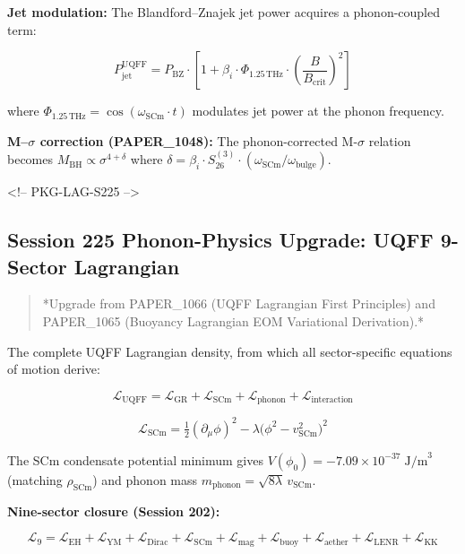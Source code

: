 \documentclass[12pt,a4paper]{article}
\begin{document}
\textbf{Jet modulation:} The Blandford--Znajek jet power acquires a phonon-coupled term:

\begin{equation}
P_{\text{jet}}^{\text{UQFF}} = P_{\text{BZ}} \cdot \left[1 + \beta_i \cdot \Phi_{1.25\,\text{THz}} \cdot \left(\frac{B}{B_{\text{crit}}}\right)^2\right]
\end{equation}

where $\Phi_{1.25\,\text{THz}} = \cos(\omega_{\text{SCm}} \cdot t)$ modulates jet power at the phonon frequency.

\textbf{M--$\sigma$ correction (PAPER\_1048):} The phonon-corrected M-$\sigma$ relation becomes $M_{\text{BH}} \propto \sigma^{4+\delta}$ where $\delta = \beta_i \cdot S_{26}^{(3)} \cdot (\omega_{\text{SCm}}/\omega_{\text{bulge}})$.

<!-- PKG-LAG-S225 -->

\subsection{Session 225 Phonon-Physics Upgrade: UQFF 9-Sector Lagrangian}

\begin{quote}
*Upgrade from PAPER\_1066 (UQFF Lagrangian First Principles) and
PAPER\_1065 (Buoyancy Lagrangian EOM Variational Derivation).*
\end{quote}

The complete UQFF Lagrangian density, from which all sector-specific equations of motion derive:

\begin{equation}
\mathcal{L}_{\text{UQFF}} = \mathcal{L}_{\text{GR}} + \mathcal{L}_{\text{SCm}} + \mathcal{L}_{\text{phonon}} + \mathcal{L}_{\text{interaction}}
\end{equation}

\begin{equation}
\mathcal{L}_{\text{SCm}} = \tfrac{1}{2}(\partial_\mu \phi)^2 - \lambda\bigl(\phi^2 - v_{\text{SCm}}^2\bigr)^2
\end{equation}

The SCm condensate potential minimum gives $V(\phi_0) = -7.09 \times 10^{-37}\;\text{J/m}^3$ (matching $\rho_{\text{SCm}}$) and phonon mass $m_{\text{phonon}} = \sqrt{8\lambda}\,v_{\text{SCm}}$.

\textbf{Nine-sector closure (Session 202):}

\begin{equation}
\mathcal{L}_{9} = \mathcal{L}_{\text{EH}} + \mathcal{L}_{\text{YM}} + \mathcal{L}_{\text{Dirac}} + \mathcal{L}_{\text{SCm}} + \mathcal{L}_{\text{mag}} + \mathcal{L}_{\text{buoy}} + \mathcal{L}_{\text{aether}} + \mathcal{L}_{\text{LENR}} + \mathcal{L}_{\text{KK}}
\end{equation}
\end{document}

